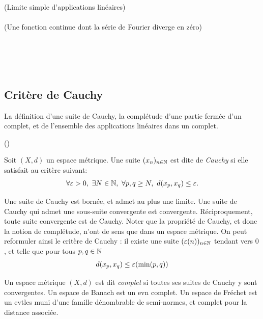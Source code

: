 { \\
 \\
 (Limite simple d'applications linéaires) \\
 \\
	 (Une fonction continue dont la série de Fourier diverge en zéro) \\
 \\
 \\
 \\
 \\
}


\subsection{Critère de Cauchy}
\label{subsec:Cauchy}

\begin{retenir}
	La définition d'une suite de Cauchy, la complétude d'une partie fermée d'un complet, et de l'ensemble des applications linéaires dans un complet.
	
	()
\end{retenir}


\begin{definition}
\label{def:suiteCauchy}
%
	Soit $(X,d)$ un espace métrique. Une suite $(x_n)_{n\in \mathbb{N}}$ est dite de \emph{Cauchy} si elle satisfait au critère suivant:
	\begin{equation*}
		\forall \varepsilon>0,\ \exists N \in \mathbb{N},\ \forall p,q \geq N,\ d(x_p,x_q) \leq \varepsilon. 
	\end{equation*}
\end{definition}

Une suite de Cauchy est bornée, et admet au plus une limite. Une suite de Cauchy qui admet une sous-suite convergente est convergente. Réciproquement, toute suite convergente est de Cauchy. 
Noter que la propriété de Cauchy, et donc la notion de complétude, n'ont de sens que dans un espace métrique. On peut reformuler ainsi le critère de Cauchy : il existe une suite $(\varepsilon(n))_{n \in \mathbb{N}}$ tendant vers $0$, et telle que pour tous $p,q\in \mathbb{N}$
\begin{equation}
\label{eqdef:suiteCauchyMin}
	d(x_p,x_q) \leq \ve(\min(p,q))
\leancheck{eqdef:suiteCauchyMin}%
\end{equation}
\begin{definition}[Complétude]
\label{def:complet}
%
Un espace métrique $(X,d)$ est dit \emph{complet} si toutes ses suites de Cauchy y sont convergentes. 
Un espace de Banach est un evn complet. 
Un espace de Fréchet est un evtlcs muni d'une famille dénombrable de semi-normes, et complet pour la distance associée.
\end{definition}


